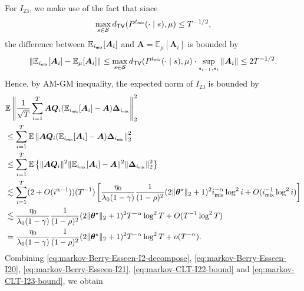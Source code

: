 For $I_{23}$, we make use of the fact that since 
\begin{align*}
\max_{s \in \mathcal{S}} d_{\mathsf{TV}}(P^{t_{\mathsf{mix}}}(\cdot \mid s), \mu) \leq T^{-1/2},
\end{align*}
the difference between $\mathbb{E}_{i_{\mathsf{mix}}}[\bm{A}_i]$ and $\bm{A} = \mathbb{E}_{\mu}[\bm{A}_i]$ is bounded by
\begin{align*}
\left\|\mathbb{E}_{i_{\mathsf{mix}}}[\bm{A}_i] - \mathbb{E}_{\mu}[\bm{A}_i] \right\|\leq \max_{s \in \mathcal{S}} d_{\mathsf{TV}}(P^{t_{\mathsf{mix}}}(\cdot \mid s), \mu) \cdot \sup_{s_{i-1},s_{i}} \|\bm{A}_i\| \leq 2T^{-1/2}.
\end{align*}
Hence, by AM-GM inequality, the expected norm of $I_{23}$ is bounded by
\begin{align}\label{eq:markov-CLT-I23-bound}
&\mathbb{E}\left\|\frac{1}{\sqrt{T}}\sum_{i=1}^T \bm{AQ}_i(\mathbb{E}_{i_{\mathsf{mix}}}[\bm{A}_i] - \bm{A}) \bm{\Delta}_{i_{\mathsf{mix}}}\right\|_2^2 \nonumber \\
&\leq \sum_{i=1}^T \mathbb{E}\left\|\bm{AQ}_i(\mathbb{E}_{i_{\mathsf{mix}}}[\bm{A}_i] - \bm{A}) \bm{\Delta}_{i_{\mathsf{mix}}} \right\|_2^2 \nonumber \\ 
&\leq \sum_{i=1}^T \mathbb{E} \left\{ \|\bm{AQ}_i\|^2 \|\mathbb{E}_{i_{\mathsf{mix}}}[\bm{A}_i] - \bm{A}\|^2 \|\bm{\Delta}_{i_{\mathsf{mix}}} \|_2^2 \right\}\nonumber \\ 
&\lesssim \sum_{i=1}^T (2+O(i^{\alpha-1})) (T^{-1}) \left[\frac{\eta_0}{\lambda_0(1-\gamma)} \frac{1}{(1-\rho)^2} (2\|\bm{\theta}^\star\|_2+1)^2 i_{\mathsf{mix}}^{-\alpha} \log^2 i + O(i_{\mathsf{mix}}^{-1} \log^2 i)\right]\nonumber \\ 
&\lesssim \frac{\eta_0}{\lambda_0(1-\gamma)} \frac{1}{(1-\rho)^2} (2\|\bm{\theta}^\star\|_2+1)^2 T^{-\alpha}\log^2 T + O(T^{-1}\log^2 T) \nonumber \\ 
&=  \frac{\eta_0}{\lambda_0(1-\gamma)} \frac{1}{(1-\rho)^2} (2\|\bm{\theta}^\star\|_2+1)^2 T^{-\alpha}\log^2 T +o(T^{-\alpha}). 
\end{align}
Combining \eqref{eq:markov-Berry-Esseen-I2-decompose}, \eqref{eq:markov-Berry-Esseen-I20}, \eqref{eq:markov-Berry-Esseen-I21}, \eqref{eq:markov-CLT-I22-bound} and \eqref{eq:markov-CLT-I23-bound}, we obtain
